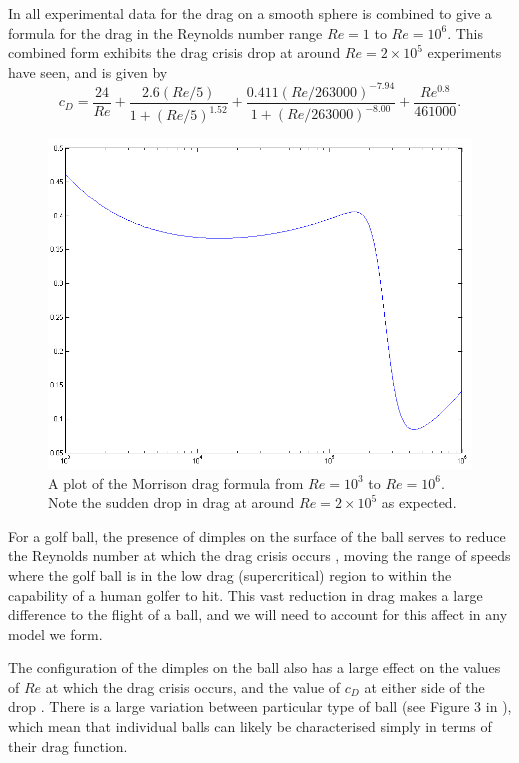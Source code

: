 In \citet{Morrison2010} all experimental data for the drag on a smooth sphere is combined to give a
formula for the drag in the Reynolds number range $Re = 1$ to $Re = 10^6$. This combined
form exhibits the drag crisis drop at around $Re = 2\times10^5$ experiments have seen, and is given by
\begin{equation}
c_D = \frac{24}{Re} + \frac{2.6(Re/5)}{1 + (Re/5)^{1.52}} + \frac{0.411(Re/263000)^{-7.94}}{1+(Re/263000)^{-8.00}}
+ \frac{Re^{0.8}}{461000} .
\end{equation}

\begin{figure}[h]
\centering
\includegraphics[scale=0.6]{../images/morrison-drag.png}
\caption[Plot of the Morrison drag formula]{A plot of the Morrison drag formula from $Re = 10^3$ to
$Re=10^6$. Note the sudden drop in drag at around $Re = 2\times10^5$ as expected.}
\end{figure}

For a golf ball, the presence of dimples on the surface of the ball serves to reduce the Reynolds
number at which the drag crisis occurs \citet{Alam2011}, moving the range of speeds where the golf
ball is in the low drag (supercritical) region to within the capability of a human golfer to hit. This
vast reduction in drag makes a large difference to the flight of a ball, and we will need to account
for this affect in any model we form.

The configuration of the dimples on the ball also has a large effect on the values of $Re$ at which 
the drag crisis occurs, and the value of $c_D$ at either side of the drop \citet{Naruo2014}. There is
a large variation between particular type of ball (see Figure 3 in \citet{Naruo2014}), which mean that
individual balls can likely be characterised simply in terms of their drag function.


